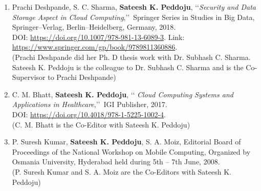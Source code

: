 
\begin{enumerate}%
	
	\item%
	Prachi Deshpande, S. C. Sharma, \textbf{Sateesh K. Peddoju},
	\lq\lq \emph{Security and Data Storage Aspect in Cloud Computing},\rq\rq\, Springer Series in
	Studies in Big Data, Springer--Verlag, Berlin--Heidelberg,
	Germany, 2018. \\DOI: \url{https://doi.org/10.1007/978-981-13-6089-3}. Link: \url{https://www.springer.com/gp/book/9789811360886}.
 \\(Prachi Deshpande did her Ph. D thesis work with Dr. Subhash C. Sharma. Sateesh K. Peddoju is the colleague to Dr. Subhash C. Sharma and is the Co-Supervisor to Prachi Deshpande)
		
	\item%
	C. M. Bhatt, \textbf{Sateesh K. Peddoju}, \lq\lq
	\emph{Cloud Computing Systems and Applications in Healthcare},\rq\rq\, IGI Publisher, 2017. \\DOI: \url{https://doi.org/10.4018/978-1-5225-1002-4}.
\\(C. M. Bhatt is the Co-Editor with Sateesh K. Peddoju)

\item%
	P. Suresh Kumar, \textbf{Sateesh K. Peddoju}, S. A. Moiz, Editorial Board of Proceedings of the National Workshop on Mobile Computing, Organized by Osmania University, Hyderabad held during 5th – 7th June, 2008.
\\(P. Suresh Kumar and S. A. Moiz are the Co-Editors with Sateesh K. Peddoju)
\end{enumerate}
